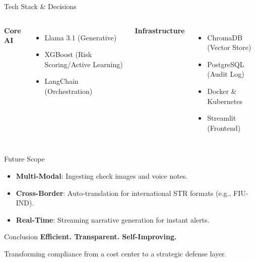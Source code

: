 \documentclass{beamer}
\begin{document}
\begin{frame}{Tech Stack & Decisions}
    \begin{columns}
        \textbf{Core AI}
        \begin{itemize}
            \item Llama 3.1 (Generative)
            \item XGBoost (Risk Scoring/Active Learning)
            \item LangChain (Orchestration)
        \end{itemize}
        
        \textbf{Infrastructure}
        \begin{itemize}
            \item ChromaDB (Vector Store)
            \item PostgreSQL (Audit Log)
            \item Docker \& Kubernetes
            \item Streamlit (Frontend)
        \end{itemize}
    \end{columns}
\end{frame}

\begin{frame}{Future Scope}
    \begin{itemize}
        \item \textbf{Multi-Modal}: Ingesting check images and voice notes.
        \item \textbf{Cross-Border}: Auto-translation for international STR formats (e.g., FIU-IND).
        \item \textbf{Real-Time}: Streaming narrative generation for instant alerts.
    \end{itemize}
\end{frame}

\begin{frame}{Conclusion}
    \centering
    \Large
    \textbf{Efficient. Transparent. Self-Improving.}
    
    \vspace{0.5cm}
    \normalsize
    Transforming compliance from a cost center to a strategic defense layer.
\end{frame}
\end{document}
